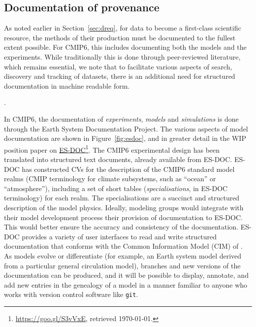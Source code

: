 \documentclass[gmd,manuscript]{copernicus}
\newcommand{\urlref}[2] {\href{#1}{#2}\footnote{\url{#1}, retrieved \today.}}
\begin{document}
\subsection{Documentation of provenance}
\label{sec:doc}

As noted earlier in Section~\ref{sec:dreq}, for data to become a
first-class scientific resource, the methods of their production must
be documented to the fullest extent possible. For CMIP6, this includes
documenting both the models and the experiments. While traditionally
this is done through peer-reviewed literature, which remains
essential, we note that to facilitate various aspects of search,
discovery and tracking of datasets, there is an additional need for
structured documentation in machine readable form.

\begin{figure*}
  \begin{center}
  \end{center}
  \caption{Elements of ES-DOC documentation. Rows indicate phases of
    the modeling process being documented, and box colors indicate the
    parties responsible for producing the documentation (see legend).
    Figure courtesy Guillaume Levavasseur, IPSL}.
  \label{fig:esdoc}
\end{figure*}

In CMIP6, the documentation of \emph{experiments}, \emph{models} and
\emph{simulations} is done through the Earth System Documentation
\citep[\urlref{https://goo.gl/WNwKD9}{ES-DOC},][]{ref:guilyardietal2013}
Project. The various aspects of model documentation are shown in
Figure~\ref{fig:esdoc}, and in greater detail in the WIP position
paper on \urlref{https://goo.gl/S3vVxE}{ES-DOC}. The CMIP6
experimental design has been translated into structured text
documents, already available from ES-DOC. ES-DOC has constructed CVs
for the description of the CMIP6 standard model realms
(CMIP terminology for climate subsystems, such as ``ocean'' or
``atmosphere''), including a set of short tables
(\emph{specialisations}, in ES-DOC terminology) for each realm.
The specialisations are a succinct and structured description of the
model physics. Ideally, modeling groups would integrate with their
model development process their provision of documentation to ES-DOC.
This would better ensure the accuracy and consistency of the
documentation. ES-DOC provides a variety of user interfaces to read
and write structured documentation that conforms with the Common
Information Model (CIM) of \cite{ref:lawrenceetal2012}. As models
evolve or differentiate (for example, an Earth system model derived
from a particular general circulation model), branches and new
versions of the documentation can be produced,
and it will be possible to display, annotate, and add new entries in
the genealogy of a model in a manner familiar to anyone who works with
version control software like \texttt{git}.
\end{document}
